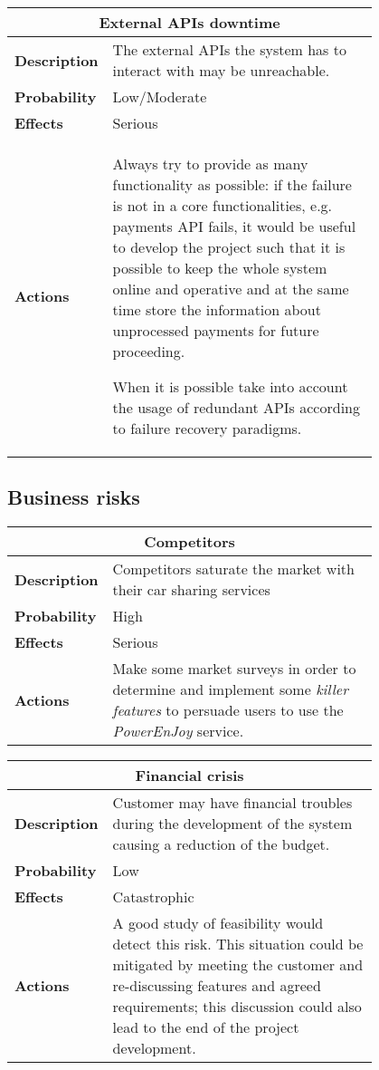 \begin{longtable}{lp{0.8\linewidth}}
\multicolumn{2}{c}{\textbf{External APIs downtime}}\\
\toprule
\textbf{Description}& The external APIs the system has to interact with may be unreachable.\\
\midrule
\textbf{Probability}&Low/Moderate\\
\midrule
\textbf{Effects}&Serious\\
\midrule
\textbf{Actions}& Always try to provide as many functionality as possible: if the failure is not in a core functionalities, e.g. payments API fails, it would be useful to develop the project such that it is possible to keep the whole system online and operative and at the same time store the information about unprocessed payments for future proceeding.

When it is possible take into account the usage of redundant APIs according to failure recovery paradigms. \\
\bottomrule
\end{longtable}

\clearpage

\subsection{Business risks}
\begin{longtable}{lp{0.8\linewidth}}
\multicolumn{2}{c}{\textbf{Competitors}}\\
\toprule
\textbf{Description}&Competitors saturate the market with their car sharing services\\
\midrule
\textbf{Probability}&High\\
\midrule
\textbf{Effects}&Serious\\
\midrule
\textbf{Actions}&Make some market surveys in order to determine and implement some \emph{killer features} to persuade users to use the \emph{PowerEnJoy} service.\\
\bottomrule
\end{longtable}

\begin{longtable}{lp{0.8\linewidth}}
\multicolumn{2}{c}{\textbf{Financial crisis}}\\
\toprule
\textbf{Description}&Customer may have financial troubles during the development of the system causing a reduction of the budget.\\
\midrule
\textbf{Probability}&Low\\
\midrule
\textbf{Effects}&Catastrophic\\
\midrule
\textbf{Actions}& A good study of feasibility would detect this risk.  This situation could be mitigated by meeting the customer and re-discussing features and agreed requirements; this discussion could also lead to the end of the project development. \\
\bottomrule
\end{longtable}

